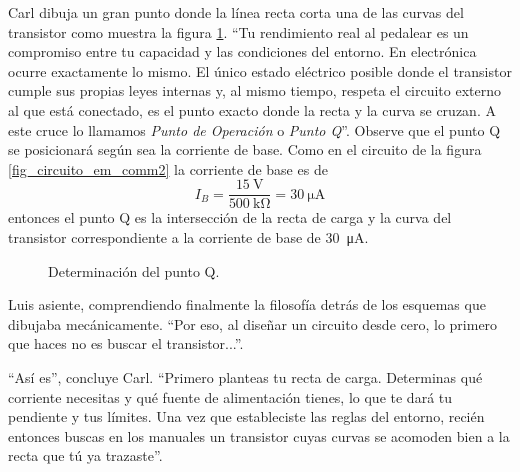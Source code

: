Carl dibuja un gran punto donde la línea recta corta una de las curvas del transistor como muestra la figura \ref{fig_punto_q}. ``Tu rendimiento real al pedalear es un compromiso entre tu capacidad y las condiciones del entorno. En electrónica ocurre exactamente lo mismo. El único estado eléctrico posible donde el transistor cumple sus propias leyes internas y, al mismo tiempo, respeta el circuito externo al que está conectado, es el punto exacto donde la recta y la curva se cruzan. A este cruce lo llamamos \emph{Punto de Operación} o \emph{Punto Q}''. Observe que el punto Q se posicionará según sea la corriente de base. Como en el circuito de la figura \ref{fig_circuito_em_comm2} la corriente de base es de 
\[
  I_B = \frac{\qty{15}{\volt}}{\qty{500}{\kilo\ohm}}=\qty{30}{\micro\ampere}
\]
entonces el punto Q es la intersección de la recta de carga y la curva del transistor correspondiente a la corriente de base de \qty{30}{\micro\ampere}.

\begin{figure}[!ht]
  \centering
  
  \caption{Determinación del punto Q.}
  \label{fig_punto_q}
\end{figure}

Luis asiente, comprendiendo finalmente la filosofía detrás de los esquemas que dibujaba mecánicamente. ``Por eso, al diseñar un circuito desde cero, lo primero que haces no es buscar el transistor...''.

``Así es'', concluye Carl. ``Primero planteas tu recta de carga. Determinas qué corriente necesitas y qué fuente de alimentación tienes, lo que te dará tu pendiente y tus límites. Una vez que estableciste las reglas del entorno, recién entonces buscas en los manuales un transistor cuyas curvas se acomoden bien a la recta que tú ya trazaste''.

